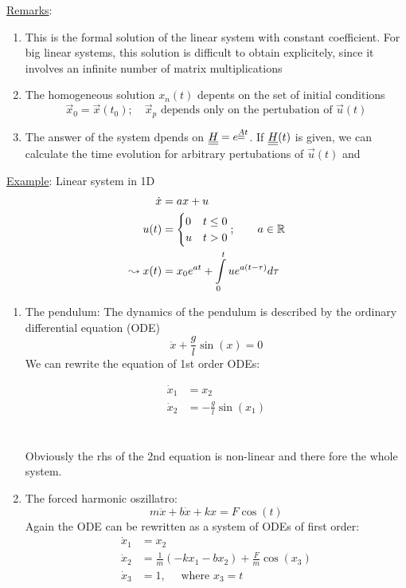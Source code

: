\underline{Remarks}:
\begin{enumerate}[label={\arabic*)}]
	\item This is the formal solution of the linear system with constant coefficient. For big linear systems, this solution is difficult to obtain explicitely, since it involves an infinite number of matrix multiplications
	\item The homogeneous solution $x_n(t)$ depents on the set of initial conditions
		\begin{equation*}
			\vec{x}_0=\vec{x}(t_0);\quad \vec{x}_p \text{ depends only on the pertubation of }\vec{u}(t)
		\end{equation*}
	\item The answer of the system dpends on $\underline{\underline{H}}=e^{\underline{\underline{A}}t}$. If $\underline{\underline{H}}(t)$ is given, we can calculate the time evolution for arbitrary pertubations of $\vec{u}(t)$ and 
\end{enumerate}
\underline{Example}: Linear system in 1D
\begin{align*}
	\dot{x}&=ax+u\\
	u(t)&=\begin{cases} 0 & t\leq 0 \\ u & t> 0 \end{cases};\qquad a\in\mathbb{R} \\
	\leadsto x(t)&=x_0e^{at}+\int\limits_0^tue^{a(t-\tau)}d\tau
\end{align*}
\textbf{\underline{}}
\begin{enumerate}[label={(\roman*)}]
	\item The pendulum: The dynamics of the pendulum is described by the ordinary differential equation (ODE)
		\begin{equation*}
			\ddot{x}+\frac{g}{l}\sin(x)=0
		\end{equation*}
		We can rewrite the equation of 1st order ODEs:\vspace{-0.5 cm}
		\begin{multicols}{2}
			\begin{align*}
				\dot{x}_1 &= x_2\\
				\dot{x}_2 &= -\frac{g}{l}\sin(x_1)
			\end{align*}\columnbreak\\\\
			Obviously the rhs of the 2nd equation is non-linear and there fore the whole system.
		\end{multicols}
	\item The forced harmonic oszillatro:
		\begin{equation*}
			m\ddot{x}+b\dot{x}+kx=F\cos(t)
		\end{equation*}
		Again the ODE can be rewritten as a system of ODEs of first order:
		\begin{align*}
			\dot{x}_1&=x_2\\
			\dot{x}_2&=\frac{1}{m}\left(-kx_1-bx_2\right)+\frac{F}{m}\cos(x_3)\\
			\dot{x}_3&=1,\quad \text{ where } x_3=t
		\end{align*}
\end{enumerate}
